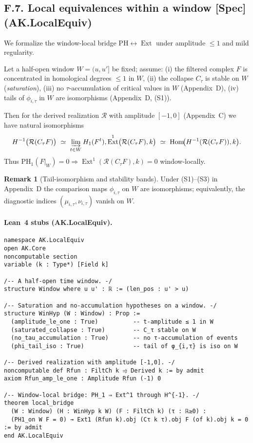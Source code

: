 \documentclass[11pt]{article}
\numberwithin{equation}{section}
\theoremstyle{plain}
\theoremstyle{definition}
\theoremstyle{remark}
\DeclareMathOperator{\Ext}{Ext}
\DeclareMathOperator{\Hom}{Hom}
\theoremstyle{plain}
\theoremstyle{definition}
\numberwithin{equation}{section}
\theoremstyle{definition}
\newtheorem{remark}[theorem]{Remark}
\numberwithin{equation}{section}
\theoremstyle{plain}
\theoremstyle{definition}
\theoremstyle{remark}
\providecommand{\n}{\unskip\space}
\begin{document}
\subsection*{F.7. Local equivalences within a window [Spec] (AK.LocalEquiv)}

We formalize the window-local bridge \(\mathrm{PH}\leftrightarrow \Ext\) under amplitude \(\le 1\) and mild regularity.

Let a half-open window \(W=(u,u']\) be fixed; assume:
(i) the filtered complex \(F\) is concentrated in homological degrees \(\le 1\) in \(W\),
(ii) the collapse \(C_\tau\) is stable on \(W\) (\emph{saturation}),
(iii) no \(\tau\)-accumulation of critical values in \(W\) (Appendix~D),
(iv) tails of \(\phi_{i,\tau}\) in \(W\) are isomorphisms (Appendix~D, (S1)).

Then for the derived realization \(\mathcal{R}\) with amplitude \([-1,0]\) (Appendix~C) we have natural isomorphisms
\[
H^{-1}\bigl(\mathcal{R}(C_\tau F)\bigr)\ \simeq\ \varinjlim_{t\in W} H_1(F^t),\qquad\n\Ext^1\bigl(\mathcal{R}(C_\tau F),k\bigr)\ \simeq\ \Hom\!\bigl(H^{-1}(\mathcal{R}(C_\tau F)),k\bigr).
\]
Thus \(\mathrm{PH}_1(F|_W)=0\Rightarrow \Ext^1(\mathcal{R}(C_\tau F),k)=0\) window-locally.

\begin{remark}[Tail-isomorphism and stability bands]
Under (S1)–(S3) in Appendix~D the comparison maps \(\phi_{i,\tau}\) on \(W\) are isomorphisms; equivalently,
the diagnostic indices \((\mu_{i,\tau},\nu_{i,\tau})\) vanish on \(W\).
\end{remark}

\paragraph{Lean~4 stubs (AK.LocalEquiv).}
\begin{verbatim}
namespace AK.LocalEquiv
open AK.Core
noncomputable section
variable (k : Type*) [Field k]

/-- A half-open time window. -/
structure Window where u u' : ℝ := (len_pos : u' > u)

/-- Saturation and no-accumulation hypotheses on a window. -/
structure WinHyp (W : Window) : Prop :=
  (amplitude_le_one : True)          -- t-amplitude ≤ 1 in W
  (saturated_collapse : True)        -- C_τ stable on W
  (no_tau_accumulation : True)       -- no τ-accumulation of events
  (phi_tail_iso : True)              -- tail of φ_{i,τ} is iso on W

/-- Derived realization with amplitude [-1,0]. -/
noncomputable def Rfun : FiltCh k ⥤ Derived k := by admit
axiom Rfun_amp_le_one : Amplitude Rfun (-1) 0

/-- Window-local bridge: PH_1 ⇒ Ext^1 through H^{-1}. -/
theorem local_bridge
  (W : Window) (H : WinHyp k W) (F : FiltCh k) (τ : ℝ≥0) :
  (PH1_on W F = 0) → Ext1 (Rfun k).obj (Cτ k τ).obj F (of k).obj k = 0 := by admit
end AK.LocalEquiv
\end{verbatim}
\end{document}
